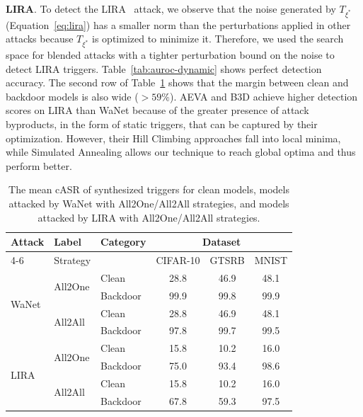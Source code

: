 \documentclass[letterpaper,twocolumn,10pt]{article}
\begin{document}
\textbf{LIRA}. To detect the LIRA~\cite{doan2021lira} attack, we observe that the noise generated by $T_{\xi^{*}}$ (Equation~\ref{eq:lira}) has a smaller norm than the perturbations applied in other attacks because $T_{\xi^{*}}$ is optimized to minimize it. Therefore, we used the search space for blended attacks with a tighter perturbation bound on the noise to detect LIRA triggers. Table~\ref{tab:auroc-dynamic} shows perfect detection accuracy. The second row of Table~\ref{tab:dynamic-partial-casr} shows that the margin between clean and backdoor models is also wide ($>59\%$). AEVA and B3D achieve higher detection scores on LIRA than WaNet because of the greater presence of attack byproducts, in the form of static triggers, that can be captured by their optimization. However, their Hill Climbing approaches fall into local minima, while Simulated Annealing allows our technique to reach global optima and thus perform better.


\begin{table}[t]
\small
\setlength{\tabcolsep}{4pt}
\caption{The mean cASR of synthesized triggers for clean models, models attacked by WaNet with All2One/All2All strategies, and models attacked by LIRA with All2One/All2All strategies.}
\label{tab:dynamic-partial-casr}
\centering
\begin{tabular}{ll l c c c}
\toprule
\multirow{2}{*}{Attack} & Label & \multirow{2}{*}{Category} 
                        & \multicolumn{3}{c}{Dataset} \\
\cline{4-6}
 & Strategy & & CIFAR-10 & GTSRB & MNIST \\
\midrule
\multirow{4}{*}{WaNet} 
 & \multirow{2}{*}{All2One} 
    & Clean    & 28.8 & 46.9 & 48.1 \\
 & 
    & Backdoor & 99.9 & 99.8 & 99.9 \\
\cline{2-6}
 & \multirow{2}{*}{All2All} 
    & Clean    & 28.8 & 46.9 & 48.1 \\
 & 
    & Backdoor & 97.8 & 99.7 & 99.5 \\
\midrule
\multirow{4}{*}{LIRA} 
 & \multirow{2}{*}{All2One} 
    & Clean    & 15.8 & 10.2 & 16.0 \\
 & 
    & Backdoor & 75.0 & 93.4 & 98.6 \\
\cline{2-6}
 & \multirow{2}{*}{All2All} 
    & Clean    & 15.8 & 10.2 & 16.0 \\
 & 
    & Backdoor & 67.8 & 59.3 & 97.5 \\
\bottomrule
\end{tabular}
\end{table}
\end{document}
